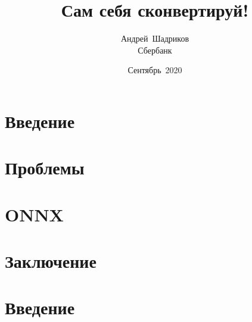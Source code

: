 \documentclass[mathserif,serif,unicode]{beamer}
\title{Сам себя сконвертируй!}
\author{Андрей~Шадриков\\
  Сбербанк}
\date{Сентябрь~2020}
\begin{document}
\begin{frame}[plain]
  \titlepage
\end{frame}

\section{Введение}

\section{Проблемы}

\section{ONNX}

\section{Заключение}

\section{Введение}
\end{document}
